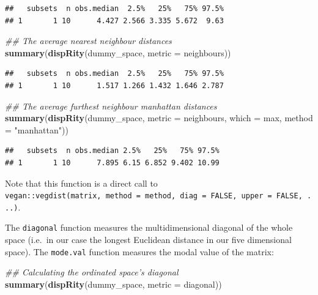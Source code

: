\documentclass[]{book}
\newenvironment{Shaded}{\begin{snugshade}}{\end{snugshade}}
\newcommand{\CommentTok}[1]{\textcolor[rgb]{0.56,0.35,0.01}{\textit{#1}}}
\newcommand{\DataTypeTok}[1]{\textcolor[rgb]{0.13,0.29,0.53}{#1}}
\newcommand{\KeywordTok}[1]{\textcolor[rgb]{0.13,0.29,0.53}{\textbf{#1}}}
\newcommand{\NormalTok}[1]{#1}
\newcommand{\StringTok}[1]{\textcolor[rgb]{0.31,0.60,0.02}{#1}}
\begin{document}
\begin{verbatim}
##   subsets  n obs.median  2.5%   25%   75% 97.5%
## 1       1 10      4.427 2.566 3.335 5.672  9.63
\end{verbatim}

\begin{Shaded}
\begin{Highlighting}[]
\CommentTok{## The average nearest neighbour distances}
\KeywordTok{summary}\NormalTok{(}\KeywordTok{dispRity}\NormalTok{(dummy_space, }\DataTypeTok{metric =}\NormalTok{ neighbours))}
\end{Highlighting}
\end{Shaded}

\begin{verbatim}
##   subsets  n obs.median  2.5%   25%   75% 97.5%
## 1       1 10      1.517 1.266 1.432 1.646 2.787
\end{verbatim}

\begin{Shaded}
\begin{Highlighting}[]
\CommentTok{## The average furthest neighbour manhattan distances}
\KeywordTok{summary}\NormalTok{(}\KeywordTok{dispRity}\NormalTok{(dummy_space, }\DataTypeTok{metric =}\NormalTok{ neighbours,}
                 \DataTypeTok{which =}\NormalTok{ max, }\DataTypeTok{method =} \StringTok{"manhattan"}\NormalTok{))}
\end{Highlighting}
\end{Shaded}

\begin{verbatim}
##   subsets  n obs.median 2.5%   25%   75% 97.5%
## 1       1 10      7.895 6.15 6.852 9.402 10.99
\end{verbatim}

Note that this function is a direct call to \texttt{vegan::vegdist(matrix,\ method\ =\ method,\ diag\ =\ FALSE,\ upper\ =\ FALSE,\ ...)}.

The \texttt{diagonal} function measures the multidimensional diagonal of the whole space (i.e.~in our case the longest Euclidean distance in our five dimensional space).
The \texttt{mode.val} function measures the modal value of the matrix:

\begin{Shaded}
\begin{Highlighting}[]
\CommentTok{## Calculating the ordinated space's diagonal}
\KeywordTok{summary}\NormalTok{(}\KeywordTok{dispRity}\NormalTok{(dummy_space, }\DataTypeTok{metric =}\NormalTok{ diagonal))}
\end{Highlighting}
\end{Shaded}
\end{document}
